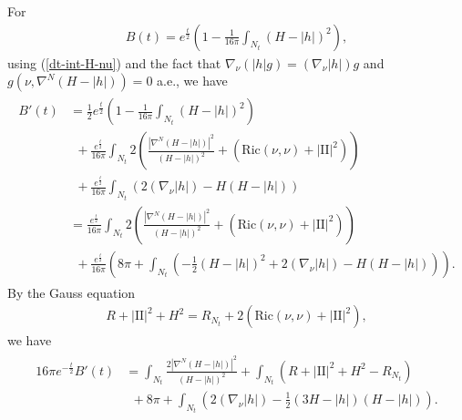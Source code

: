 \documentclass[11pt, letterpaper]{amsart}
\theoremstyle{definition}
\theoremstyle{remark}
\begin{document}
For
\begin{align*}
	B(t) = e ^{\frac{t}{2}} \left( 1- \frac{1}{16 \pi } \int_{N_t} (H - |h|)^2 \right) ,
\end{align*} 
using (\ref{dt-int-H-nu}) and the fact that $\nabla _{\nu } (|h| g)  = (\nabla _{\nu } |h| ) g$ and $ g  (\nu , \nabla ^{N}(H- |h|) ) =0$ a.e., we have
	\begin{align*}
		\begin{split}
			B'(t) &= \frac{1}{2  } e ^{\frac{t}{2}} \left( 1- \frac{1}{16 \pi } \int_{N_t} (H- |h|)^2 \right)  \\
		&\ \ + \frac{e ^{\frac{t}{2}}}{16 \pi }  \int_{N_t} 2  \left(   \frac{|\nabla ^{N} (H-|h| )|^2}{(H-|h| )^2} + \left( \mathrm{Ric}(\nu ,\nu ) +|\mathrm{II}|^2 \right) \right)\\
				&\ \ + \frac{e ^{\frac{t}{2}}}{16 \pi }  \int_{N_t} \left( 2 (\nabla _{\nu } |h| )  -H(H-|h| ) \right) \\
				&=  \frac{e ^{\frac{t}{2}} }{16 \pi  }  \int_{N_t} 2  \left(   \frac{|\nabla ^{N} (H-|h| )|^2}{(H-|h| )^2} + \left( \mathrm{Ric}(\nu ,\nu ) +|\mathrm{II}|^2 \right) \right)\\
				&\ \ + \frac{ e ^{\frac{t}{2}} }{16 \pi } \left( 8 \pi+ \int_{N_t} \left(  - \frac{1}{2}(H-|h| )^2 + 2 (\nabla _{\nu } |h| )    -H(H-|h| ) \right) \right) .
		\end{split}
	\end{align*}
	By the Gauss equation
	\begin{align*}
		R + |\mathrm{II}|^2 + H^2 = R_{N_t} + 2 \left( \mathrm{Ric}(\nu , \nu ) + |\mathrm{II}|^2 \right) ,
	\end{align*} 
	we have 
	\begin{align*}
		\begin{split}
			16 \pi e ^{- \frac{t}{2}} B'(t)
			&=    \int_{N_t} \frac{2 |\nabla ^{N} (H-|h| )|^2}{(H-|h| )^2} + \int_{N_t} \left( R + |\mathrm{II}|^2 + H^2 - R_{N_t} \right) \\
		&\ \ + 8 \pi +  \int_{N_t}   \left(    2 (\nabla _{\nu } |h| )    -\frac{1}{2}(3H-|h| )(H- |h| ) \right)   .
		\end{split}
	\end{align*}
\end{document}
